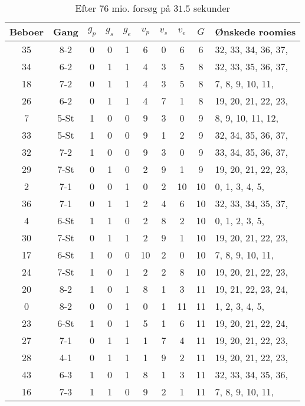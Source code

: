 \documentclass[article,oneside,11pt,a4paper]{memoir}
\newenvironment{assignment}[1]{
\begin{table}[h]
\caption{#1}
\footnotesize
\begin{center}
\begin{tabular}{cccccccccl}
\toprule
Beboer & Gang & $g_p$ & $g_s$ & $g_e$ & $v_p$ & $v_s$ & $v_e$ & $G$ & Ønskede roomies \\ \midrule
}{
\bottomrule
\end{tabular}
\end{center}
\end{table}

}
\begin{document}
\begin{assignment}{Efter 76 mio. forsøg på $31.5$ sekunder}
    35 & 8-2  &   0 &   0 &   1 &   6 &   0 &   6 &  6 &  32, 33, 34, 36, 37, \\
    34 & 6-2  &   0 &   1 &   1 &   4 &   3 &   5 &  8 &  32, 33, 35, 36, 37, \\
    18 & 7-2  &   0 &   1 &   1 &   4 &   3 &   5 &  8 &   7,  8,  9, 10, 11, \\
    26 & 6-2  &   0 &   1 &   1 &   4 &   7 &   1 &  8 &  19, 20, 21, 22, 23, \\
     7 & 5-St &   1 &   0 &   0 &   9 &   3 &   0 &  9 &   8,  9, 10, 11, 12, \\
    33 & 5-St &   1 &   0 &   0 &   9 &   1 &   2 &  9 &  32, 34, 35, 36, 37, \\
    32 & 7-2  &   1 &   0 &   0 &   9 &   3 &   0 &  9 &  33, 34, 35, 36, 37, \\
    29 & 7-St &   0 &   1 &   0 &   2 &   9 &   1 &  9 &  19, 20, 21, 22, 23, \\
     2 & 7-1  &   0 &   0 &   1 &   0 &   2 &  10 & 10 &   0,  1,  3,  4,  5, \\
    36 & 7-1  &   0 &   1 &   1 &   2 &   4 &   6 & 10 &  32, 33, 34, 35, 37, \\
     4 & 6-St &   1 &   1 &   0 &   2 &   8 &   2 & 10 &   0,  1,  2,  3,  5, \\
    30 & 7-St &   0 &   1 &   1 &   2 &   9 &   1 & 10 &  19, 20, 21, 22, 23, \\
    17 & 6-St &   1 &   0 &   0 &  10 &   2 &   0 & 10 &   7,  8,  9, 10, 11, \\
    24 & 7-St &   1 &   0 &   1 &   2 &   2 &   8 & 10 &  19, 20, 21, 22, 23, \\
    20 & 8-2  &   1 &   0 &   1 &   8 &   1 &   3 & 11 &  19, 21, 22, 23, 24, \\
     0 & 8-2  &   0 &   0 &   1 &   0 &   1 &  11 & 11 &   1,  2,  3,  4,  5, \\
    23 & 6-St &   1 &   0 &   1 &   5 &   1 &   6 & 11 &  19, 20, 21, 22, 24, \\
    27 & 7-1  &   0 &   1 &   1 &   1 &   7 &   4 & 11 &  19, 20, 21, 22, 23, \\
    28 & 4-1  &   0 &   1 &   1 &   1 &   9 &   2 & 11 &  19, 20, 21, 22, 23, \\
    43 & 6-3  &   1 &   0 &   1 &   8 &   1 &   3 & 11 &  32, 33, 34, 35, 36, \\
    16 & 7-3  &   1 &   1 &   0 &   9 &   2 &   1 & 11 &   7,  8,  9, 10, 11, \\

\end{assignment}
\end{document}
